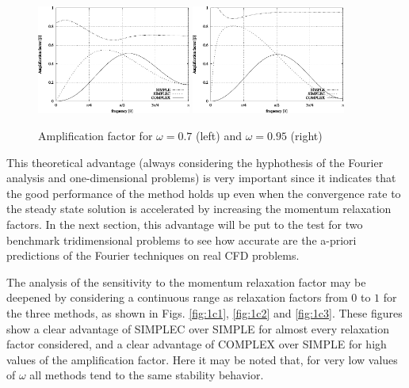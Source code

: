 \documentclass[final,3p,times,10pt,onecolumn]{myElsarticle}
\numberwithin{equation}{section}
\begin{document}
\begin{figure}[H]
    \centering
    \includegraphics[width=0.45\textwidth]{fig/w07} \hspace{1cm}
    \includegraphics[width=0.45\textwidth]{fig/w095}
    \caption{Amplification factor for $\omega=0.7$ (left) and $\omega=0.95$ (right)}
    \label{fig:1b}
\end{figure}    

This theoretical advantage (always considering the hyphothesis of the Fourier analysis and one-dimensional problems) is very important since it indicates that the good performance of the method holds up even when the convergence rate to the steady state solution is accelerated by increasing the momentum relaxation factors. In the next section, this advantage will be put to the test for two benchmark tridimensional problems to see how accurate are the a-priori predictions of the Fourier techniques on real CFD problems.

The analysis of the sensitivity to the momentum relaxation factor may be deepened by considering a continuous range as relaxation factors from $0$ to $1$ for the three methods, as shown in Figs. \ref{fig:1c1}, \ref{fig:1c2} and \ref{fig:1c3}. These figures show a clear advantage of SIMPLEC over SIMPLE for almost every relaxation factor considered, and a clear advantage of COMPLEX over SIMPLE for high values of the amplification factor. Here it may be noted that, for very low values of $\omega$ all methods tend to the same stability behavior.
\end{document}
